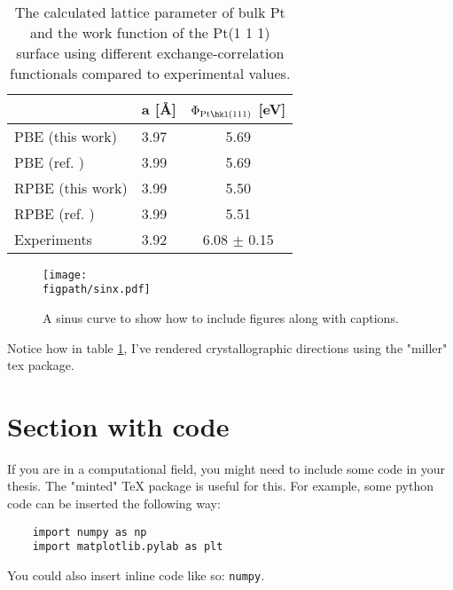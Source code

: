 \begin{table}[!tbh]
\begin{center}
  \begin{tabular}{llc}
  \toprule
       &  a [\AA{}]  &  $\Phi\mathrm{_{Pt\hkl(111)}}$ [eV]  \\
  \midrule
  PBE (this work) &  3.97  &    5.69  \\
  PBE (ref. \cite{Singh-miller2009}) & 3.99  &    5.69   \\
  RPBE (this work) &  3.99 &   5.50 \\
  RPBE (ref. \cite{Sakong2018})&  3.99 &   5.51 \\
  Experiments &  3.92 \cite{Kittel1976} &   6.08 $\pm$ 0.15 \cite{Salmeron1983} \\
  \bottomrule
  \end{tabular}
\end{center}
\caption[Calculated lattice parameter of Pt and work function of the Pt\hkl(1 1 1)
surface.]{The calculated lattice parameter of bulk Pt and the work function of the
Pt\hkl(1 1 1) surface using different exchange-correlation functionals compared to
experimental values.}
\label{main_tab1}
\end{table}

\begin{figure}[!tbh]
\centering
\texttt{[image: \\figpath/sinx.pdf]}
\caption[A sinus curve]{A sinus curve to show how to include figures along with
captions.} %
\label{main_fig1}
\end{figure}

Notice how in table \ref{main_tab1}, I've rendered crystallographic directions using
the "miller" tex package.

\section{Section with code}
\label{sec_code}

If you are in a computational field, you might need to include some code in your
thesis. The "minted" TeX package is useful for this. For example, some python code
can be inserted the following way:

\begin{verbatim}
    import numpy as np
    import matplotlib.pylab as plt
\end{verbatim}

You could also insert inline code like so: \texttt{numpy}.
